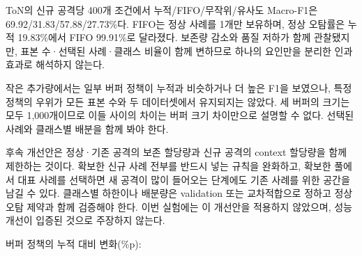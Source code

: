 ToN의 신규 공격당 400개 조건에서 누적/\allowbreak{}FIFO/\allowbreak{}무작위/\allowbreak{}유사도 Macro-F1은 69.92/\allowbreak{}31.83/\allowbreak{}57.88/\allowbreak{}27.73\%다. FIFO는 정상 사례를 1개만 보유하며, 정상 오탐률은 누적 19.83\%에서 FIFO 99.91\%로 달라졌다. 보존량 감소와 품질 저하가 함께 관찰됐지만, 표본 수·선택된 사례·클래스 비율이 함께 변하므로 하나의 요인만을 분리한 인과 효과로 해석하지 않는다.

작은 추가량에서는 일부 버퍼 정책이 누적과 비슷하거나 더 높은 F1을 보였으나, 특정 정책의 우위가 모든 표본 수와 두 데이터셋에서 유지되지는 않았다. 세 버퍼의 크기는 모두 1,000개이므로 이들 사이의 차이는 버퍼 크기 차이만으로 설명할 수 없다. 선택된 사례와 클래스별 배분을 함께 봐야 한다.

후속 개선안은 정상·기존 공격의 보존 할당량과 신규 공격의 context 할당량을 함께 제한하는 것이다. 확보한 신규 사례 전부를 반드시 넣는 규칙을 완화하고, 확보한 풀에서 대표 사례를 선택하면 새 공격이 많이 들어오는 단계에도 기존 사례를 위한 공간을 남길 수 있다. 클래스별 하한이나 배분량은 validation 또는 교차적합으로 정하고 정상 오탐 제약과 함께 검증해야 한다. 이번 실험에는 이 개선안을 적용하지 않았으며, 성능 개선이 입증된 것으로 주장하지 않는다.

버퍼 정책의 누적 대비 변화(\%p):


